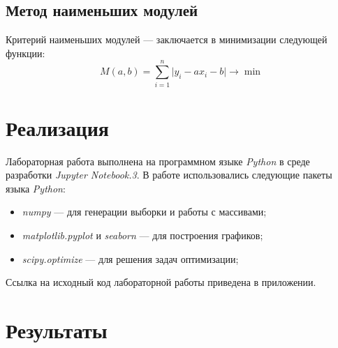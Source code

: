 \documentclass[12pt,a4paper]{article}
\begin{document}
	\subsection{Метод наименьших модулей}
	Критерий наименьших модулей --- заключается в минимизации следующей функции:
	\begin{equation} \label{least_abs}
	M(a,b) = \sum\limits_{i=1}^n\vert y_i-ax_i-b\vert\to\min
	\end{equation}
	
	\section{Реализация}
		Лабораторная работа выполнена на программном языке \emph{Python} в среде разработки \emph{Jupyter Notebook.3}. В работе использовались следующие пакеты языка \emph{Python}:
		\begin{itemize}
			\item \emph{numpy} --- для генерации выборки и работы с массивами;
			
			\item \emph{matplotlib.pyplot} и \emph{seaborn} --- для построения графиков;
			
			\item \emph{scipy.optimize} --- для решения задач оптимизации;
		\end{itemize}
		Ссылка на исходный код лабораторной работы приведена в приложении.
		
	\section{Результаты}
\end{document}
